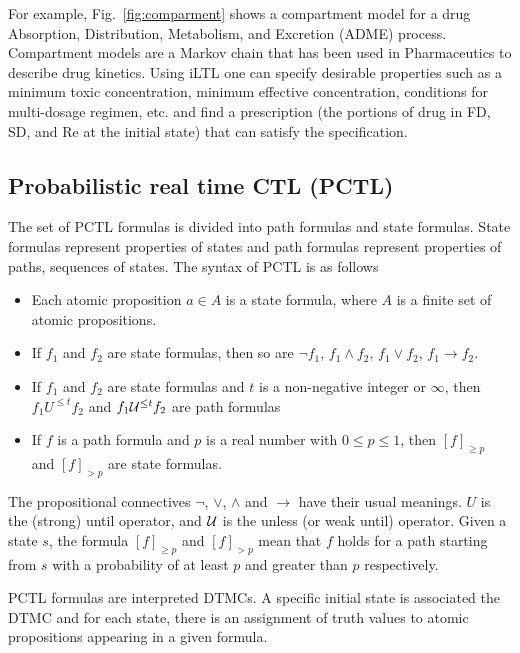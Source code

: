 For example, Fig.~\ref{fig:comparment} shows a compartment model for a drug Absorption, Distribution, Metabolism, and Excretion (ADME) process. Compartment models are a Markov chain that has been used in Pharmaceutics to describe drug kinetics. Using iLTL one can specify desirable properties such as a minimum toxic concentration, minimum effective concentration, conditions for multi-dosage regimen, etc. and find a prescription (the portions of drug in FD, SD, and Re at the initial state) that can satisfy the specification.



\subsection{Probabilistic real time CTL (PCTL)}
\label{sec:pctl}

The set of PCTL formulas is divided into path formulas and state formulas. State formulas represent properties of states and path formulas represent properties of paths, sequences of states.
The syntax of PCTL is as follows
\begin{itemize}
\item Each atomic proposition $a\in A$ is a state formula, where $A$ is a finite set of atomic propositions.
\item If $f_1$ and $f_2$ are state formulas, then so are $\neg f_1$, $f_1 \wedge f_2$, $f_1 \vee f_2$, $f_1\rightarrow f_2$.
\item If $f_1$ and $f_2$ are state formulas and $t$ is a non-negative integer or $\infty$, then $f_1 U^{\leq t} f_2$ and $f_1 {\cal U}^{\leq t} f_2$ are path formulas
\item If $f$ is a path formula and $p$ is a real number with $0\leq p\leq 1$, then $[f]_{\geq p}$ and $[f]_{>p}$ are state formulas.
\end{itemize}
The propositional connectives $\neg$, $\vee$, $\wedge$ and $\rightarrow$ have their usual meanings. $U$ is the (strong) until operator, and $\cal U$ is the unless (or weak until) operator. Given a state $s$, the formula $[f]_{\geq p}$ and $[f]_{>p}$ mean that $f$ holds for a path starting from $s$ with a probability of at least $p$ and greater than $p$ respectively.

PCTL formulas are interpreted DTMCs. A specific initial state is associated the DTMC and for each state, there is an assignment of truth values to atomic propositions appearing in a given formula.

